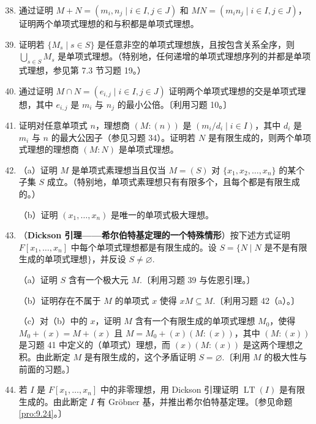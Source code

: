 \begin{enumerate}
\setcounter{enumi}{37}
\item 通过证明 \(M+N = (m_i, n_j \mid i \in I, j \in J)\) 和 \(MN = (m_in_j \mid i \in I, j \in J)\)，证明两个单项式理想的和与积都是单项式理想。

\item 证明若 \(\{M_s \mid s \in S\}\) 是任意非空的单项式理想族，且按包含关系全序，则 \(\bigcup_{s \in S} M_s\) 是单项式理想。（特别地，任何递增的单项式理想序列的并都是单项式理想，参见第 7.3 节习题 19。）

\item 通过证明 \(M \cap N = (e_{i,j} \mid i \in I, j \in J)\) 证明两个单项式理想的交是单项式理想，其中 \(e_{i,j}\) 是 \(m_i\) 与 \(n_j\) 的最小公倍。〔利用习题 10。〕

\item 证明对任意单项式 \(n\)，理想商 \((M : (n))\) 是 \((m_i/d_i \mid i \in I)\)，其中 \(d_i\) 是 \(m_i\) 与 \(n\) 的最大公因子（参见习题 34）。证明若 \(N\) 是有限生成的，则两个单项式理想的理想商 \((M : N)\) 是单项式理想。

\item （a）证明 \(M\) 是单项式素理想当且仅当 \(M = (S)\) 对 \(\{x_1, x_2, \ldots, x_n\}\) 的某个子集 \(S\) 成立。（特别地，单项式素理想只有有限多个，且每个都是有限生成的。）

（b）证明 \((x_1, \ldots, x_n)\) 是唯一的单项式极大理想。

\item （\textbf{Dickson 引理——希尔伯特基定理的一个特殊情形}）按下述方式证明 \(F[x_1, \ldots, x_n]\) 中每个单项式理想都是有限生成的。设 \(S = \{N \mid N\) 是不是有限生成的单项式理想\(\}\)，并反设 \(S \neq \varnothing\).

（a）证明 \(S\) 含有一个极大元 \(M\).〔利用习题 39 与佐恩引理。〕

（b）证明存在不属于 \(M\) 的单项式 \(x\) 使得 \(xM \subseteq M\).〔利用习题 42（a）。〕

（c）对（b）中的 \(x\)，证明 \(M\) 含有一个有限生成的单项式理想 \(M_0\)，使得 \(M_0+(x) = M+(x)\) 且 \(M = M_0 + (x)(M : (x))\)，其中 \((M : (x))\) 是习题 41 中定义的（单项式）理想，而 \((x)(M : (x))\) 是这两个理想之积。由此断定 \(M\) 是有限生成的，这个矛盾证明 \(S = \varnothing\).〔利用 \(M\) 的极大性与前面的习题。〕

\item 若 \(I\) 是 \(F[x_1, \ldots, x_n]\) 中的非零理想，用 Dickson 引理证明 \(\operatorname{LT}(I)\) 是有限生成的。由此断定 \(I\) 有 Gröbner 基，并推出希尔伯特基定理。〔参见命题 \ref{pro:9.24}。〕


\end{enumerate}
